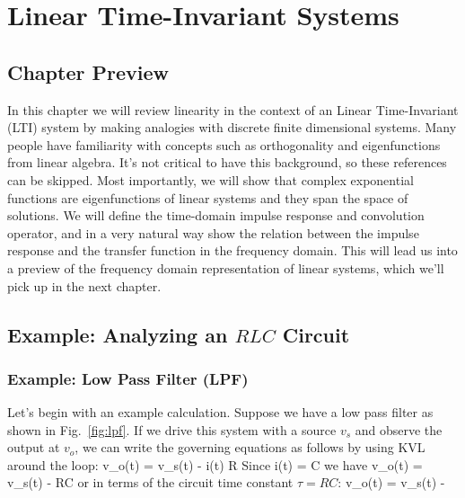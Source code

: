 

\chapter{Linear Time-Invariant Systems}




\graphicspath{{./figs_LTI/}}




\section{Chapter Preview}


In this chapter we will review linearity in the context of an Linear Time-Invariant (LTI) system by making analogies with discrete finite dimensional systems.  Many people have familiarity with concepts such as orthogonality and eigenfunctions from linear algebra.  It's not critical to have this background, so these references can be skipped.  Most importantly, we will show that complex exponential functions are eigenfunctions of linear systems and they span the space of solutions.  We will define the time-domain impulse response and convolution operator, and in a very natural way show the relation between the impulse response and the transfer function in the frequency domain.  This will lead us into a preview of the frequency domain representation of linear systems, which we'll pick up in the next chapter.







\section{Example:  Analyzing an $RLC$ Circuit}





\subsection{Example:  Low Pass Filter (LPF)}

Let's begin with an example calculation.  Suppose we have a low pass filter as shown in Fig.~\ref{fig:lpf}.  If we drive this system with a source $v_s$ and observe the output at $v_o$, we can write the governing equations as follows by using KVL around the loop:
\be v_o(t) = v_s(t) - i(t) R \ee
Since
\be i(t) = C   \ee
we have
\be v_o(t) = v_s(t) - RC   \ee
or in terms of the circuit time constant $\tau = RC$:
\be v_o(t) = v_s(t) - \tau {}  \ee

